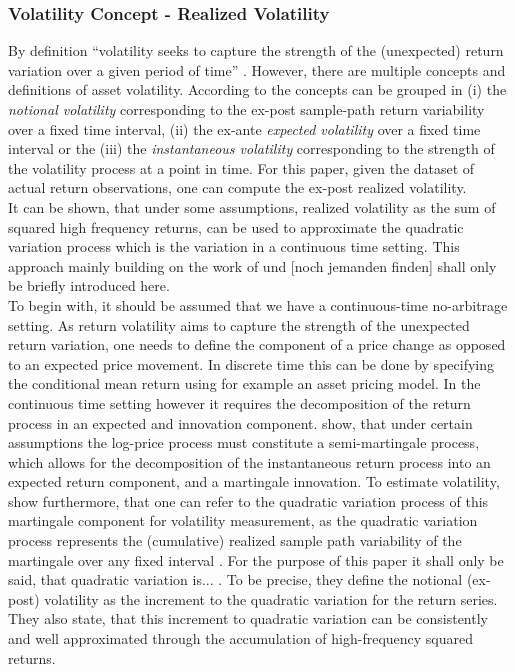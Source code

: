 \subsubsection{Volatility Concept - Realized Volatility}
By definition ``volatility seeks to capture the strength of the (unexpected) return variation over a given period of time'' \parencite[p.7]{andersen2001}. However, there are multiple concepts and definitions of asset volatility. According to \citeauthor{andersen2001} the concepts can be grouped in (i) the \emph{notional volatility} corresponding to the ex-post sample-path return variability over a fixed time interval, (ii) the ex-ante \emph{expected volatility} over a fixed time interval or the (iii) the \emph{instantaneous volatility} corresponding to the strength of the volatility process at a point in time.
For this paper, given the dataset of actual return observations, one can compute the ex-post realized volatility.\\
It can be shown, that under some assumptions, realized volatility as the sum of squared high frequency returns, can be used to approximate the quadratic variation process which is the variation in a continuous time setting. This approach mainly building on the work of \citeauthor{andersen2001} und [noch jemanden finden] shall only be briefly introduced here. \\
To begin with, it should be assumed that we have a continuous-time no-arbitrage setting. As return volatility aims to capture the strength of the unexpected return variation, one needs to define the component of a price change as opposed to an expected price movement. In discrete time this can be done by specifying the conditional mean return using for example an asset pricing model. In the continuous time setting however it requires the decomposition of the return process in an expected and innovation component. \citeauthor{andersen2001} show, that under certain assumptions the log-price process must constitute a semi-martingale process, which allows for the decomposition of the instantaneous return process into an expected return component, and a martingale innovation. To estimate volatility, \citeauthor{andersen2001} show furthermore, that one can refer to the quadratic variation process of this martingale component for volatility measurement, as the quadratic variation process represents the (cumulative) realized sample path variability of the martingale over any fixed interval \parencite{andersen2001}. For the purpose of this paper it shall only be said, that quadratic variation is... . To be precise, they define the notional (ex-post) volatility as the increment to the quadratic variation for the return series. They also state, that this increment to quadratic variation can be consistently and well approximated through the accumulation of high-frequency squared returns.


